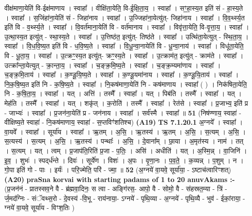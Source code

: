 \documentclass[17pt]{extarticle}
\begin{document}
                  वीक्ष॑माणा॒येति॑ वि-ईक्ष॑माणाय । स्वाहा᳚ । वीक्षि॑ता॒येति॒ वि-ई॒क्षि॒ता॒य॒ । स्वाहा᳚ । सꣳ॒॒हा॒स्य॒त इति॑ सं - हा॒स्य॒ते । स्वाहा᳚ । स॒जिंहा॑ना॒येति॑ सं - जिहा॑नाय । स्वाहा᳚ । उ॒ज्जिहा॑ना॒येत्यु॑त्- जिहा॑नाय । स्वाहा᳚ । वि॒व॒र्थ्स्य॒त इति॑ वि - व॒र्थ्स्य॒ते । स्वाहा᳚ । वि॒वर्त॑माना॒येति॑ वि - वर्त॑मानाय । स्वाहा᳚ । विवृ॑त्ता॒येति॒ वि-वृ॒त्ता॒य॒ । स्वाहा᳚ । उ॒त्था॒स्य॒त इत्यु॑त् - स्था॒स्य॒ते । स्वाहा᳚ । उ॒त्तिष्ठ॑त॒ इत्यु॑त्- तिष्ठ॑ते । स्वाहा᳚ । उत्थि॑ता॒येत्युत् - स्थि॒ता॒य॒ । स्वाहा᳚ । वि॒ध॒वि॒ष्य॒त इति॑ वि - ध॒वि॒ष्य॒ते । स्वाहा᳚ । वि॒धू॒न्वा॒नायेति॑ वि - धू॒न्वा॒नाय॑ । स्वाहा᳚ । विधू॑ता॒येति॒ वि - धू॒ता॒य॒ । स्वाहा᳚ । उ॒त्क्रꣳ॒॒स्य॒त इत्यु॑त्- क्रꣳ॒॒स्य॒ते । स्वाहा᳚ । उ॒त्क्राम॑त॒ इत्यु॑त् - क्राम॑ते । स्वाहा᳚ । उत्क्रा᳚न्ता॒येत्युत् - क्रा॒न्ता॒य॒ । स्वाहा᳚ । च॒ङ्क्र॒मि॒ष्य॒ते । स्वाहा᳚ । च॒ङ्क्र॒म्यमा॑णाय । स्वाहा᳚ । च॒ङ्क्र॒मि॒ताय॑ । स्वाहा᳚ । क॒ण्डू॒यि॒ष्य॒ते । स्वाहा᳚ । क॒ण्डू॒यमा॑नाय । स्वाहा᳚ । क॒ण्डू॒यि॒ताय॑ । स्वाहा᳚ । नि॒क॒षि॒ष्य॒त इति॑ नि - क॒षि॒ष्य॒ते । स्वाहा᳚ । नि॒कष॑माणा॒येति॑ नि - कष॑माणाय । स्वाहा᳚ ( ) । निक॑षिता॒येति॒ नि - क॒षि॒ता॒य॒ । स्वाहा᳚ । यत् । अत्ति॑ । तस्मै᳚ । स्वाहा᳚ । यत् । पिब॑ति । तस्मै᳚ । स्वाहा᳚ । यत् । मेह॑ति । तस्मै᳚ । स्वाहा᳚ । यत् । शकृ॑त् । क॒रोति॑ । तस्मै᳚ । स्वाहा᳚ । रेत॑से । स्वाहा᳚ । प्र॒जाभ्य॒ इति॑ प्र - जाभ्यः॑ । स्वाहा᳚ । प्र॒जन॑ना॒येति॑ प्र - जन॑नाय । स्वाहा᳚ । सर्व॑स्मै । स्वाहा᳚ ॥ \textbf{  51 } \newline
                  \newline
                      (निष॑ण्णाय॒ स्वाहा॑ - वीक्षिष्य॒ते स्वाहा॑ - नि॒कष॑माणाय॒ स्वाहा॑ - स॒प्तविꣳ॑शतिश्च)  \textbf{(A19)} \newline \newline
                                \textbf{ TS 7.1.20.1} \newline
                  अ॒ग्नये᳚ । स्वाहा᳚ । वा॒यवे᳚ । स्वाहा᳚ । सूर्या॑य । स्वाहा᳚ । ऋ॒तम् । अ॒सि॒ । ऋ॒तस्य॑ । ऋ॒तम् । अ॒सि॒ । स॒त्यम् । अ॒सि॒ । स॒त्यस्य॑ । स॒त्यम् । अ॒सि॒ । ऋ॒तस्य॑ । पन्थाः᳚ । अ॒सि॒ । दे॒वाना᳚म् । छा॒या । अ॒मृत॑स्य । नाम॑ । तत् । स॒त्यम् । यत् । त्वम् । प्र॒जाप॑ति॒रिति॑ प्र॒जा - प॒तिः॒ । असि॑ । अधीति॑ । यत् । अ॒स्मि॒न्न् । वा॒जिनि॑ । इ॒व॒ । शुभः॑ । स्पद्‌र्ध॑न्ते । दिवः॑ । सूर्ये॑ण । विशः॑ । अ॒पः । वृ॒णा॒नः । प॒व॒ते॒ । क॒व्यन्न् । प॒शुम् । न । गो॒पा इति॑ गो - पाः । इर्यः॑ । परि॒ज्मेति॒ परि॑ - ज्मा॒ ॥ \textbf{  52} \newline
                  \newline
                      (अ॒ग्नये॑ वा॒यवे॒ सूर्या॑या॒ - ऽष्टाच॑त्वारिꣳशत्)  \textbf{(A20)} \newline \newline
\textbf{praSna korvai with starting padams of 1 to 20 anuvAkams :-} \newline
(प्र॒जन॑नं - प्रातस्सव॒ने वै - ब्र॑ह्मवा॒दिनः॒ स त्वा - अङ्गि॑रस॒- आपो॒ वै - सोमो॒ वै - स॑हस्रत॒म्या - त्रि॑ - र्ज॒मद॑ग्निः - संॅवथ्स॒रो - दे॒वस्य॑ -वि॒भू - राय॑नाया॒- ऽग्नये॑ - पृथि॒व्या - अ॒ग्नये॑ - पृथि॒व्यै - भुव॑ - ईकां॒राया॒ - ग्नये॑ वा॒यवे॒ सूर्या॑य - विꣳश॒तिः ) \newline
\end{document}
